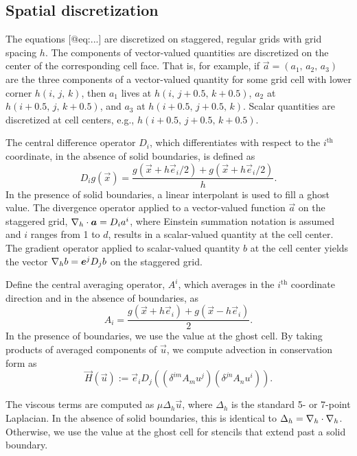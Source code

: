 \subsection{Spatial discretization}

The equations [@eq:...] are discretized on staggered, regular grids with grid
spacing $h$. The components of vector-valued quantities are discretized on the
center of the corresponding cell face. That is, for example, if
$\vec{a} = (a_1,\,a_2,\,a_3)$ are the three components of a vector-valued
quantity for some grid cell with lower corner $h(i,\,j,\,k)$, then $a_1$
lives at $h(i,\,j+0.5,\,k+0.5)$, $a_2$ at $h(i+0.5,\,j,\,k+0.5)$, and $a_3$ at
$h(i+0.5,\,j+0.5,\,k)$. Scalar quantities are discretized at cell centers,
e.g., $h(i+0.5,\,j+0.5,\,k+0.5)$.

The central difference operator $D_i$, which differentiates with respect to
the $i^\text{th}$ coordinate, in the absence of solid boundaries, is defined as
\begin{equation}
    D_ig(\vec{x}) = \frac{g(\vec{x}+h\vec{e}_i/2) + g(\vec{x}+h\vec{e}_i/2)}{h}.
\end{equation}
In the presence of solid boundaries, a linear interpolant is used to fill a
ghost value. The divergence operator applied to a vector-valued function
$\vec{a}$ on the staggered grid, $\nabla_h\cdot\boldsymbol{a} = D_ia^i$, where Einstein
summation notation is assumed and $i$ ranges from 1 to $d$, results in
a scalar-valued quantity at the cell center. The gradient operator applied to
scalar-valued quantity $b$ at the cell center yields the vector
$\nabla_hb = \boldsymbol{e}^jD_jb$ on the staggered grid.

Define the central averaging operator, $A^i$, which averages in the
$i^\text{th}$ coordinate direction and in the absence of boundaries, as
\begin{equation}
    A_i = \frac{g(\vec{x}+h\vec{e}_i)+g(\vec{x}-h\vec{e}_i)}{2}.
\end{equation}
In the presence of boundaries, we use the value at the ghost cell. By taking
products of averaged components of $\vec{u}$, we compute advection in
conservation form as
\begin{equation}
    \vec{H}(\vec{u}) := \vec{e}_iD_j((\delta^{im}A_mu^j)(\delta^{jn}A_nu^i)).
\end{equation}

The viscous terms are computed as $\mu\Delta_h\vec{u}$, where $\Delta_h$ is the
standard 5- or 7-point Laplacian. In the absence of solid boundaries, this
is identical to  $\Delta_h = \nabla_h\cdot\nabla_h$. Otherwise, we use the value
at the ghost cell for stencils that extend past a solid boundary.

